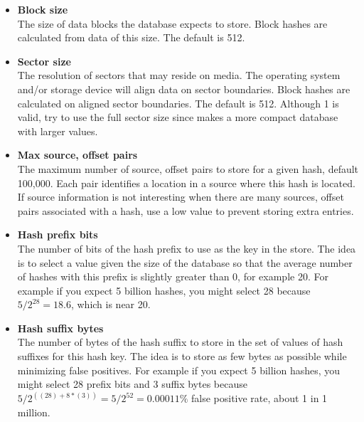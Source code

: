 \documentclass[11pt,fleqn]{article} %
\begin{document}
\begin{itemize}
\item \textbf{Block size}\\
The size of data blocks the database expects to store. Block hashes are calculated from data of this size. The default is 512.\\

\item \textbf{Sector size}\\
The resolution of sectors that may reside on media. The operating system and/or storage device will align data on sector boundaries. Block hashes are calculated on aligned sector boundaries. The default is 512. Although 1 is valid, try to use the full sector size since \hdb makes a more compact database with larger values.\\

\item \textbf{Max source, offset pairs}\\
The maximum number of source, offset pairs to store for a given hash, default 100,000. Each pair identifies a location in a source where this hash is located. If source information is not interesting when there are many sources, offset pairs associated with a hash, use a low value to prevent storing extra entries.\\

\item \textbf{Hash prefix bits}\\
The number of bits of the hash prefix to use as the key in the store. The idea is to select a value given the size of the database so that the average number of hashes with this prefix is slightly greater than 0, for example 20. For example if you expect 5 billion hashes, you might select 28 because $5/2^{28}=18.6$, which is near 20.\\

\item \textbf{Hash suffix bytes}\\
The number of bytes of the hash suffix to store in the set of values of hash suffixes for this hash key. The idea is to store as few bytes as possible while minimizing false positives. For example if you expect 5 billion hashes, you might select 28 prefix bits and 3 suffix bytes because $5 / 2^{((28) + 8*(3))} = 5 / 2^{52} = 0.00011\%$ false positive rate, about 1 in 1 million.\\
\end{itemize}
\end{document}
